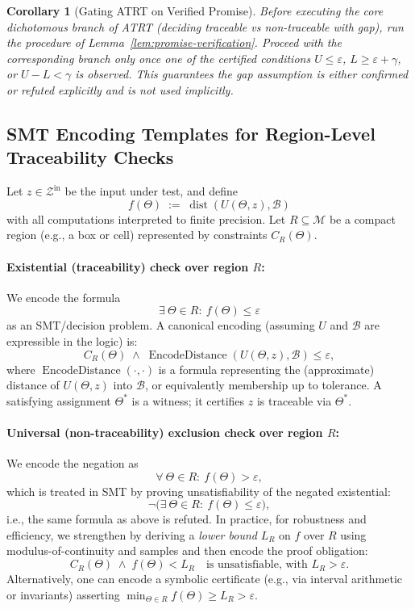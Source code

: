 \documentclass[12pt]{article}
\theoremstyle{definition}
\theoremstyle{plain}
\newtheorem{corollary}{Corollary}[section]
\begin{document}
\begin{corollary}[Gating ATRT on Verified Promise]
\label{cor:promise-gate}
Before executing the core dichotomous branch of ATRT (deciding traceable vs non-traceable with gap), run the procedure of Lemma~\ref{lem:promise-verification}. Proceed with the corresponding branch only once one of the certified conditions \(U\le\varepsilon\), \(L\ge\varepsilon+\gamma\), or \(U-L<\gamma\) is observed. This guarantees the gap assumption is either confirmed or refuted explicitly and is not used implicitly.
\end{corollary}


\subsection{SMT Encoding Templates for Region-Level Traceability Checks}

Let \(z\in\mathcal Z^{\mathrm{in}}\) be the input under test, and define 
\[
f(\Theta)\;:=\;\operatorname{dist}(U(\Theta,z),\mathcal B)
\]
with all computations interpreted to finite precision. Let \(R\subseteq\mathcal M\) be a compact region (e.g., a box or cell) represented by constraints \(C_R(\Theta)\).

\paragraph{Existential (traceability) check over region \(R\):}  
We encode the formula
\[
\exists\ \Theta\in R:\ f(\Theta)\le \varepsilon
\]
as an SMT/decision problem. A canonical encoding (assuming \(U\) and \(\mathcal B\) are expressible in the logic) is:
\[
C_R(\Theta)\;\wedge\;
\operatorname{EncodeDistance}(U(\Theta,z),\mathcal B) \le \varepsilon,
\]
where \(\operatorname{EncodeDistance}(\cdot,\cdot)\) is a formula representing the (approximate) distance of \(U(\Theta,z)\) into \(\mathcal B\), or equivalently membership up to tolerance.  
A satisfying assignment \(\Theta^*\) is a witness; it certifies \(z\) is traceable via \(\Theta^*\).

\paragraph{Universal (non-traceability) exclusion check over region \(R\):}  
We encode the negation as
\[
\forall\ \Theta\in R:\ f(\Theta) > \varepsilon,
\]
which is treated in SMT by proving unsatisfiability of the negated existential:
\[
\neg\bigl(\exists\ \Theta\in R:\ f(\Theta)\le \varepsilon\bigr),
\]
i.e., the same formula as above is refuted. In practice, for robustness and efficiency, we strengthen by deriving a \emph{lower bound} \(L_R\) on \(f\) over \(R\) using modulus-of-continuity and samples and then encode the proof obligation:
\[
C_R(\Theta)\;\wedge\;
f(\Theta) < L_R \quad \text{is unsatisfiable, with } L_R > \varepsilon.
\]
Alternatively, one can encode a symbolic certificate (e.g., via interval arithmetic or invariants) asserting \(\min_{\Theta\in R}f(\Theta)\ge L_R>\varepsilon\).
\end{document}

